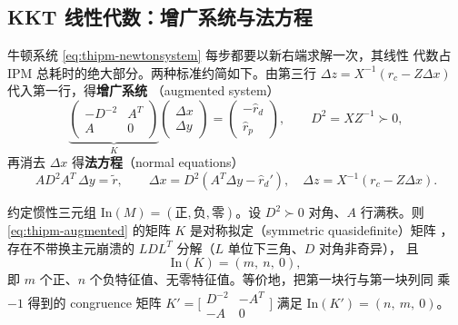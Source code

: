 \subsection{KKT 线性代数：增广系统与法方程}\label{subsec:thipm-kkt}

牛顿系统 \eqref{eq:thipm-newtonsystem} 每步都要以新右端求解一次，其线性
代数占 IPM 总耗时的绝大部分。两种标准约简如下。由第三行
$\Delta z=X^{-1}(r_c-Z\Delta x)$ 代入第一行，得\textbf{增广系统}
（augmented system）
\begin{equation}\label{eq:thipm-augmented}
  \underbrace{\begin{pmatrix}
    -D^{-2} & A^{T}\\
    A & 0
  \end{pmatrix}}_{K}
  \begin{pmatrix}\Delta x\\ \Delta y\end{pmatrix}
  =
  \begin{pmatrix} -\hat r_d\\ \hat r_p\end{pmatrix},
  \qquad D^{2}=XZ^{-1}\succ0 ,
\end{equation}
再消去 $\Delta x$ 得\textbf{法方程}（normal equations）
\begin{equation}\label{eq:thipm-normal}
  AD^{2}A^{T}\,\Delta y=\tilde r,
  \qquad
  \Delta x=D^{2}(A^{T}\Delta y-\hat r_d'),\quad
  \Delta z=X^{-1}(r_c-Z\Delta x).
\end{equation}

\begin{lemma}[增广矩阵的惯性]\label{lem:thipm-inertia}
约定惯性三元组 $\mathrm{In}(M)=(\text{正},\text{负},\text{零})$。设
$D^{2}\succ0$ 对角、$A$ 行满秩。则 \eqref{eq:thipm-augmented} 的矩阵
$K$ 是对称拟定（symmetric quasidefinite）矩阵 \cite{ipmvanderbei1995}，
存在不带换主元崩溃的 $LDL^{T}$ 分解（$L$ 单位下三角、$D$ 对角非奇异），
且
\begin{equation}\label{eq:thipm-inertia-lp}
  \mathrm{In}(K)=(m,\ n,\ 0),
\end{equation}
即 $m$ 个正、$n$ 个负特征值、无零特征值。等价地，把第一块行与第一块列同
乘 $-1$ 得到的 congruence 矩阵
$K'=\bigl[\begin{smallmatrix} D^{-2} & -A^{T}\\ -A & 0\end{smallmatrix}\bigr]$
满足 $\mathrm{In}(K')=(n,\ m,\ 0)$。
\end{lemma}

